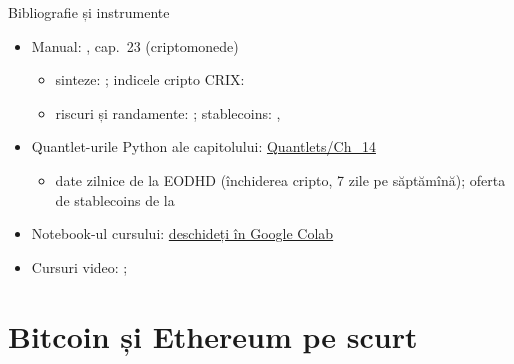 \begin{frame}{Bibliografie și instrumente}
\itemsize{\small}
\begin{itemize}
    \item Manual: , cap.~23 (criptomonede)
    \begin{itemize}
        \item sinteze: ; indicele cripto CRIX: 
        \item riscuri și randamente: ; stablecoins: , 
    \end{itemize}
    \item Quantlet-urile Python ale capitolului: \href{https://github.com/danpele/SFM/tree/main/Quantlets/Ch_14}{Quantlets/Ch\_14}
    \begin{itemize}
        \item date zilnice de la EODHD (închiderea cripto, 7 zile pe săptămînă); oferta de stablecoins de la 
    \end{itemize}
    \item Notebook-ul cursului: \href{\colaburl{notebooks/EN/chapter14_lecture_notebook.ipynb}}{deschideți în Google Colab}
    \item Cursuri video: ; 
\end{itemize}
\end{frame}


\section{Bitcoin și Ethereum pe scurt}

